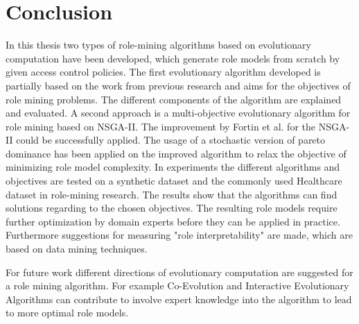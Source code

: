 \newpage
\chapter{Conclusion}
\label{sec:conclusion}
\iffalse
\hl{State what you've done and what you've found
	Summarize contributions (achievements and impact)
	Outline open issues/directions for future work
	\\\\
	The final chapter of the Master's thesis is the Conclusions chapter. Here is where the writer sums up the entire project in one to two brief paragraphs. This chapter should remind the reader of the initial problem statement or hypothesis and then relate that to the results from the study. The writer should then present any conclusions reached or any new insights that arose from this work.  Finally, the writer should present the research in terms of the overall impact in the field. For example, how will the results of this study change the way a person or organization behaves or makes decisions? One caution when writing this chapter is not to merely reiterate the other portions of the thesis. Instead, the writer should strive to leave a lasting impression upon the reader, conveying with the same passion that drove the research project the importance of the work completed.
	\\\\
	Summary of the problem, the main findings and the discussion. Structured according to the issues in chapter 2.
	Comparison with the literature presented in chapter 2: how do your results fill in, advance or contradict previously reported research?
	What are the implications of your research for people working in the field that you have studies? In which direction should further research go? }
\fi
In this thesis two types of role-mining algorithms based on evolutionary computation have been developed, which generate role models from scratch by given access control policies.
The first evolutionary algorithm developed is partially based on the work from previous research\cite{saenko2012design} and aims for the objectives of role mining problems. The different components of the algorithm are explained and evaluated. 
A second approach is a multi-objective evolutionary algorithm for role mining based on NSGA-II\cite{Deb:2002}. The improvement by Fortin et al. for the NSGA-II\cite{Fortin:2013} could be successfully applied. The usage of a stochastic version of pareto dominance\cite{clune2013evolutionary} has been applied on the improved algorithm to relax the objective of minimizing role model complexity.
In experiments the different algorithms and objectives are tested on a synthetic dataset and the commonly used Healthcare dataset in role-mining research\cite{Ene}.
The results show that the algorithms can find solutions regarding to the chosen objectives.
The resulting role models require further optimization by domain experts before they can be applied in practice.
Furthermore suggestions for measuring "role interpretability" are made, which are based on data mining techniques.

For future work different directions of evolutionary computation are suggested for a role mining algorithm. For example Co-Evolution and Interactive Evolutionary Algorithms can contribute to involve expert knowledge into the algorithm to lead to more optimal role models.
